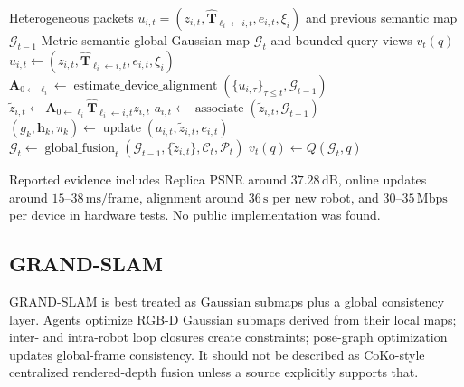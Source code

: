 \documentclass[11pt, a4paper, logo]{googledeepmind}
\begin{document}
\begin{algorithm}[H]
\caption{HAMMER}
\label{alg:hammer}
\small
\begin{algorithmic}[1]
  \Require Heterogeneous packets $u_{i,t}=(z_{i,t},\hat{\mathbf{T}}_{\ell_i\leftarrow i,t},e_{i,t},\xi_i)$ and previous semantic map $\mathcal{G}_{t-1}$
  \Ensure Metric-semantic global Gaussian map $\mathcal{G}_t$ and bounded query views $v_t(q)$
  \State $u_{i,t} \gets (z_{i,t},\hat{\mathbf{T}}_{\ell_i\leftarrow i,t},e_{i,t},\xi_i)$ 
  \State $\mathbf{A}_{0\leftarrow\ell_i} \gets \operatorname{estimate\_device\_alignment}(\{u_{i,\tau}\}_{\tau\leq t},\mathcal{G}_{t-1})$ 
  \State $\tilde{z}_{i,t} \gets \mathbf{A}_{0\leftarrow\ell_i}\hat{\mathbf{T}}_{\ell_i\leftarrow i,t}z_{i,t}$ 
  \State $a_{i,t} \gets \operatorname{associate}(\tilde{z}_{i,t},\mathcal{G}_{t-1})$ 
  \State $(g_k,\mathbf{h}_k,\pi_k) \gets \operatorname{update}(a_{i,t},\tilde{z}_{i,t},e_{i,t})$ 
  \State $\mathcal{G}_t \gets \operatorname{global\_fusion}_t(\mathcal{G}_{t-1},\{\tilde{z}_{i,t}\},\mathcal{C}_t,\mathcal{P}_t)$ 
  \State $v_t(q) \gets Q(\mathcal{G}_t,q)$ 
\end{algorithmic}
\end{algorithm}

Reported evidence includes Replica PSNR around $37.28\,\mathrm{dB}$, online updates around $15$--$38\,\mathrm{ms/frame}$, alignment around $36\,\mathrm{s}$ per new robot, and $30$--$35\,\mathrm{Mbps}$ per device in hardware tests. No public implementation was found.

\subsection{GRAND-SLAM}
\label{sec:systems:grand-slam}

GRAND-SLAM \citep{thomas2025grand_slam} is best treated as Gaussian submaps plus a global consistency layer. Agents optimize RGB-D Gaussian submaps derived from their local maps; inter- and intra-robot loop closures create constraints; pose-graph optimization updates global-frame consistency. It should not be described as CoKo-style centralized rendered-depth fusion unless a source explicitly supports that.
\end{document}
